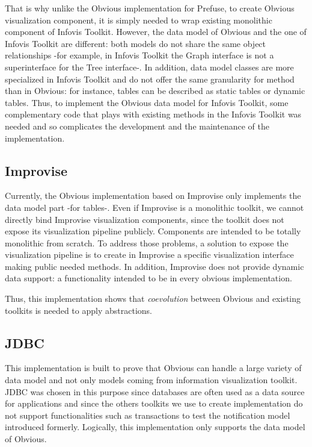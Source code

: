 That is why unlike the Obvious implementation for Prefuse, to create Obvious visualization component, it is simply needed to wrap existing monolithic component of Infovis Toolkit. However, the data model of Obvious and the one of Infovis Toolkit are different: both models do not share the same object relationships -for example, in Infovis Toolkit the Graph interface is not a superinterface for the Tree interface-. In addition, data model classes are more specialized in Infovis Toolkit and do not offer the same granularity for method than in Obvious: for instance, tables can be described as static tables or dynamic tables. Thus, to implement the Obvious data model for Infovis Toolkit, some complementary code that plays with existing methods in the Infovis Toolkit was needed and so complicates the development and the maintenance of the implementation.

\subsection{Improvise}

Currently, the Obvious implementation based on Improvise only implements the data model part -for tables-. Even if Improvise is a monolithic toolkit, we cannot directly bind Improvise visualization components, since the toolkit does not expose its visualization pipeline publicly. Components are intended to be totally monolithic from scratch. To address those problems, a solution to expose the visualization pipeline is to create in Improvise a specific visualization interface making public needed methods. In addition, Improvise does not provide dynamic data support: a functionality intended to be in every obvious implementation.

Thus, this implementation shows that \emph{coevolution} between Obvious and existing toolkits is needed to apply abstractions.

\subsection{JDBC}

This implementation is built to prove that Obvious can handle a large variety of data model and not only models coming from information visualization toolkit. JDBC was chosen in this purpose since databases are often used as a data source for applications and since the others toolkits we use to create implementation do not support functionalities such as transactions to test the notification model introduced formerly. Logically, this implementation only supports the data model of Obvious.

